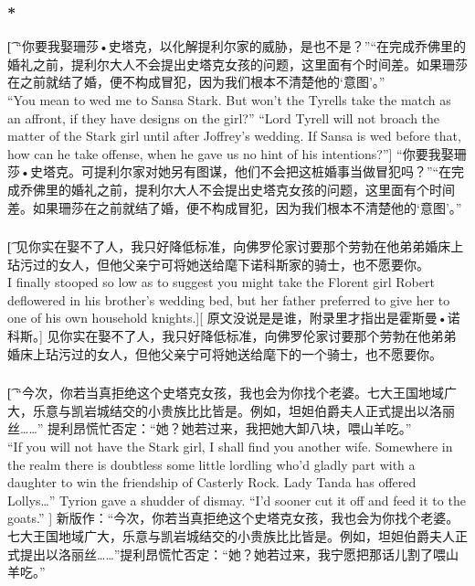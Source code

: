 \documentclass[12pt,a4paper]{article}
\begin{document}
\subsubsection{\color{red}*}\t[
	“你要我娶珊莎•史塔克，以化解提利尔家的威胁，是也不是？”“在完成乔佛里的婚礼之前，提利尔大人不会提出史塔克女孩的问题，这里面有个时间差。如果珊莎在之前就结了婚，便不构成冒犯，因为我们根本不清楚他的‘意图’。”\\
	“You mean to wed me to Sansa Stark. But won't the Tyrells take the match as an affront, if they have designs on the girl?” “Lord Tyrell will not broach the matter of the Stark girl until after Joffrey's wedding. If Sansa is wed before that, how can he take offense, when he gave us no hint of his intentions?”]
	“你要我娶珊莎•史塔克。可提利尔家对她另有图谋，他们不会把这桩婚事当做冒犯吗？”“在完成乔佛里的婚礼之前，提利尔大人不会提出史塔克女孩的问题，这里面有个时间差。如果珊莎在之前就结了婚，便不构成冒犯，因为我们根本不清楚他的‘意图’。”
	
\subsubsection{}\t[
	见你实在娶不了人，我只好降低标准，向佛罗伦家讨要那个劳勃在他弟弟婚床上玷污过的女人，但他父亲宁可将她送给麾下诺科斯家的骑士，也不愿要你。\\
	I finally stooped so low as to suggest you might take the Florent girl Robert deflowered in his brother's wedding bed, but her father preferred to give her to one of his own household knights.][
	原文没说是是谁，附录里才指出是霍斯曼•诺科斯。]
	见你实在娶不了人，我只好降低标准，向佛罗伦家讨要那个劳勃在他弟弟婚床上玷污过的女人，但他父亲宁可将她送给麾下的一个骑士，也不愿要你。
	
\subsubsection{}\t[
	 “今次，你若当真拒绝这个史塔克女孩，我也会为你找个老婆。七大王国地域广大，乐意与凯岩城结交的小贵族比比皆是。例如，坦妲伯爵夫人正式提出以洛丽丝……” 提利昂慌忙否定：“她？她若过来，我把她大卸八块，喂山羊吃。” \\
	 “If you will not have the Stark girl, I shall find you another wife. Somewhere in the realm there is doubtless some little lordling who'd gladly part with a daughter to win the friendship of Casterly Rock. Lady Tanda has offered Lollys\ldots” Tyrion gave a shudder of dismay. “I'd sooner cut it off and feed it to the goats.” ]
	 新版作：“今次，你若当真拒绝这个史塔克女孩，我也会为你找个老婆。七大王国地域广大，乐意与凯岩城结交的小贵族比比皆是。例如，坦妲伯爵夫人正式提出以洛丽丝……”提利昂慌忙否定：“她？她若过来，我宁愿把那话儿割了喂山羊吃。”
	 
\end{document}
